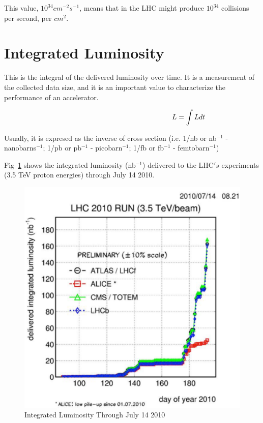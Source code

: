 \;
\;
\noindent
This value, $10^{34}cm^{-2}s^{-1}$, means that in the LHC might produce $10^{34}$ collisions per second, per $cm^{2}$. 

\;
\;

\section{Integrated Luminosity}

\noindent
This is the integral of the delivered luminosity over time. It is a measurement of the collected data size, and it is an important value to characterize the performance of an accelerator.

\begin{equation}\hspace{57 mm}L = \int L dt \end{equation}

\;
\;

\noindent
Usually, it is expresed as the inverse of cross section (i.e. 1/nb or nb$^{-1}$ - nanobarns$^{-1}$; 1/pb or pb$^{-1}$ - picobarn$^{-1}$; 1/fb or fb$^{-1}$ - femtobarn$^{-1}$)

\;
\;

\noindent Fig~\ref{fig:accel4} shows the integrated luminosity (nb$^{-1}$) delivered to the LHC$'s$ experiments (3.5 TeV proton energies) through July 14 2010.

\;
\;

\begin{figure}[h]
\centering\includegraphics[scale=0.7]{./Particleaccelerators/Pictures/fig4.pdf}
\caption{Integrated Luminosity Through July 14 2010}
\label{fig:accel4}
\end{figure}

